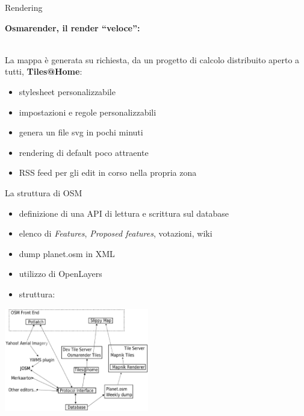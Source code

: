 \documentclass[slidestop,compress,red,notes,xcolor=dvipsnames]{beamer}	%
\begin{document}
        \begin{frame}{Rendering}
            \begin{large}
                \textbf{Osmarender, il render ``veloce'':}
            \end{large}\\
            La mappa è generata su richiesta, da un progetto di calcolo distribuito aperto a tutti, \textbf{Tiles@Home}:
            \begin{itemize}
                \item stylesheet personalizzabile
                \item impostazioni e regole personalizzabili
                \item genera un file svg in pochi minuti
                \item rendering di default poco attraente
                \item RSS feed per gli edit in corso nella propria zona
            \end{itemize}
        \end{frame}

        \begin{frame}{La struttura di OSM}
            \begin{itemize}
                \item definizione di una API di lettura e scrittura sul database
                \item elenco di \textit{Features}, \textit{Proposed features}, votazioni, wiki
                \item dump planet.osm in XML
                \item utilizzo di OpenLayers
                \item struttura:
            \end{itemize}
            \begin{center}
                \includegraphics[height=4.5cm]{images/struttura.eps}
            \end{center}
        \end{frame}
\end{document}
